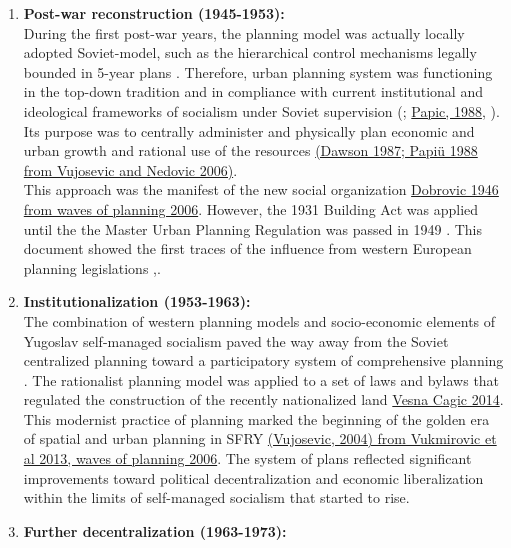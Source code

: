 \documentclass[11pt]{report}
\begin{document}
\begin{enumerate}
\item \textbf{Post-war reconstruction (1945-1953):}
\\
During the first post-war years, the planning model was actually locally adopted Soviet-model, such as the hierarchical  control  mechanisms legally bounded in 5-year plans \href{ref}{\citealt{vujosevic_planning_2006}}.
Therefore, urban planning system was functioning in the top-down tradition and in compliance with current institutional and ideological frameworks of socialism under Soviet supervision (\href{ref}{\citealt{dawson_yugoslavia_1987}}; \href{ref}{Papic, 1988}, \href{ref}{\citealt{peric_evolution_2016}}).
Its purpose was to centrally administer and physically plan economic and urban growth and rational use of the resources \href{ref}{(Dawson  1987; Papiü 1988 from Vujosevic and Nedovic 2006)}. 
\\

This approach was the manifest of the new social organization \href{ref}{Dobrovic 1946 from waves of planning 2006}.
However, the 1931 Building Act was applied until the the Master Urban Planning Regulation was passed in 1949 \href{ref}{\citealt{nedovicbudic_waves_2006}}.
This document showed the first traces of the influence from western European planning legislations \href{ref}{\citealt{peric_evolution_2016}},\href{ref}{\citealt{nedovicbudic_waves_2006}}.

\item \textbf{Institutionalization (1953-1963):}
\\
The combination of western planning models and socio-economic elements of Yugoslav self-managed socialism paved the way away from the Soviet centralized planning toward a participatory system of comprehensive planning
\href{ref}{\citealt{nedovic-budic_mornings_2011}}.
The rationalist planning model was applied to a set of laws and bylaws that regulated the construction of the recently nationalized land \href{ref}{Vesna Cagic 2014}.
This modernist practice of planning marked the beginning of the golden era of spatial and urban planning in SFRY
\href{ref}{(Vujosevic, 2004) from Vukmirovic et al 2013, waves of planning 2006}.
The system of plans reflected significant improvements toward political decentralization and economic liberalization within the limits of self-managed socialism that started to rise\href{ref}{\citealt{peric_evolution_2016}}.

\item \textbf{Further decentralization (1963-1973):}


\end{enumerate}
\end{document}
